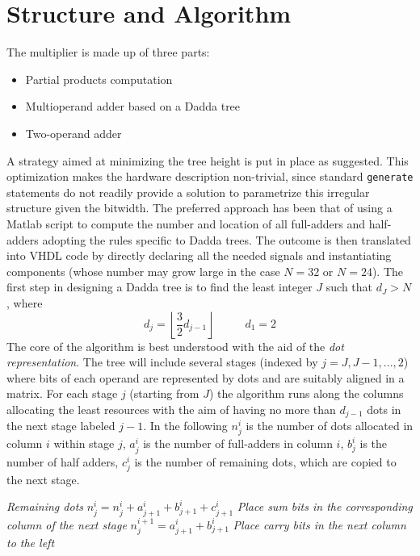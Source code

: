 \section{Structure and Algorithm}
The multiplier is made up of three parts:
\begin{itemize}
	\item Partial products computation
	\item Multioperand adder based on a Dadda tree
	\item Two-operand adder
\end{itemize}
A strategy aimed at minimizing the tree height is put in place as suggested.
This optimization makes the hardware description non-trivial, since standard \texttt{generate} statements do not readily provide a solution to parametrize this irregular structure given the bitwidth.
The preferred approach has been that of using a Matlab script to compute the number and location of all full-adders and half-adders adopting the rules specific to Dadda trees. The outcome is then translated into VHDL code by directly declaring all the needed signals and instantiating components (whose number may grow large in the case $N=32$ or $N=24$).
The first step in designing a Dadda tree is to find the least integer $J$ such that $d_J > N$, where
\begin{equation*}
d_j = \left \lfloor{\frac{3}{2}d_{j-1}}\right \rfloor \hspace{1cm}\,\,d_1 = 2
\end{equation*}
The core of the algorithm is best understood with the aid of the \textit{dot representation}. The tree will include several stages (indexed by $j=J, J-1, ..., 2$) where bits of each operand are represented by dots and are suitably aligned in a matrix. For each stage $j$ (starting from $J$) the algorithm runs along the columns allocating the least resources with the aim of having no more than $d_{j-1}$ dots in the next stage labeled $j-1$. In the following $n_j^i$ is the number of dots allocated in column $i$ within stage $j$, $a_j^i$ is the number of full-adders in column $i$, $b_j^i$ is the number of half adders, $c_j^i$ is the number of remaining dots, which are copied to the next stage.

\newpage

\begin{algorithmic}
		\ELSE
		\ENDIF
		 \textit{ Remaining dots}
		\STATE $n_j^i = n_j^i + a_{j+1}^i + b_{j+1}^i + c_{j+1}^i$ \textit{Place sum bits in the corresponding column of the next stage}
		\STATE $n_j^{i+1} = a_{j+1}^i + b_{j+1}^i$ \textit{Place carry bits in the next column to the left}
		\ENDFOR
	\ENDFOR
\end{algorithmic}

